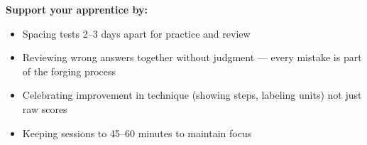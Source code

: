 {\begin{tcolorbox}
    \medskip
    \textbf{Support your apprentice by:}
    \begin{itemize}[leftmargin=*, itemsep=1pt]
        \item Spacing tests 2--3 days apart for practice and review
        \item Reviewing wrong answers together without judgment --- every mistake
            is part of the forging process
        \item Celebrating improvement in technique (showing steps, labeling units)
            not just raw scores
        \item Keeping sessions to 45--60 minutes to maintain focus
    \end{itemize}
\end{tcolorbox}

}

\newpage
